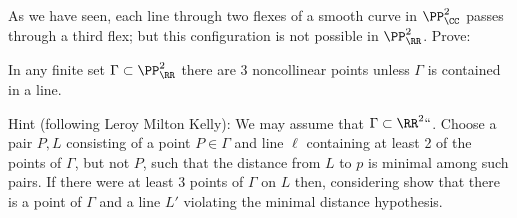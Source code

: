 \begin{exercise}\label{Sylvester-Gallai-Kelly}
As we have seen, each line through two flexes of a smooth curve 
in $\PP^2_\CC$ passes through a third flex; but
this configuration is not possible in $\PP^2_\RR$. Prove:

\begin{theorem}
In any finite set  $\Gamma \subset \PP^2_\RR$ there are $3$ 
noncollinear points unless $\Gamma$ is contained in a line.
\unif
\end{theorem}

Hint (following Leroy Milton Kelly): 
%
We may assume that $\Gamma\subset \RR^2` `$. Choose a pair $P,L$ consisting of a point $P\in\Gamma$ and line $\ell$ containing at least 2 of the points of $\Gamma$, but not $P$, such that the distance from $L$ to $p$ is
minimal among such pairs. If there were at least 3 points of $\Gamma$
on $L$ then, considering  
show that
there is a point of $\Gamma$ and a line $L'$ violating the minimal distance hypothesis.
\end{exercise}

